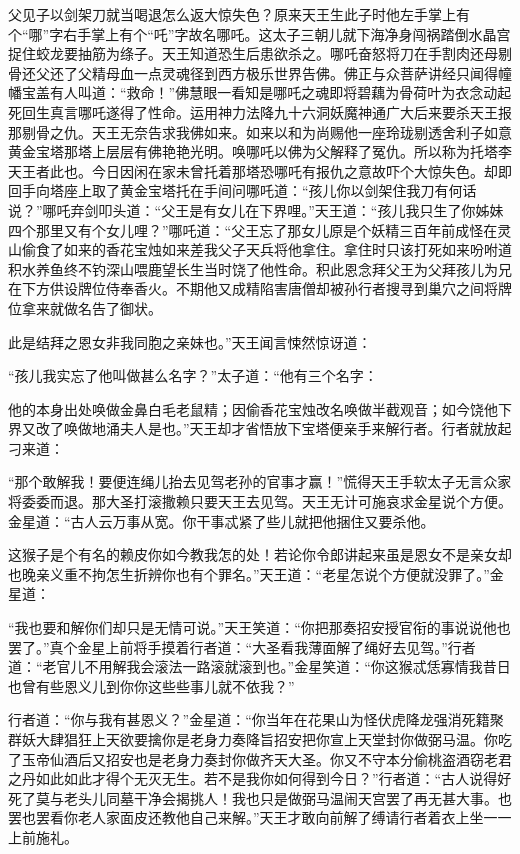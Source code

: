 \documentclass[12pt,UTF8]{ctexbook}
\begin{document}
{	父见子以剑架刀就当喝退怎么返大惊失色？原来天王生此子时他左手掌上有个“哪”字右手掌上有个“吒”字故名哪吒。这太子三朝儿就下海净身闯祸踏倒水晶宫捉住蛟龙要抽筋为绦子。天王知道恐生后患欲杀之。哪吒奋怒将刀在手割肉还母剔骨还父还了父精母血一点灵魂径到西方极乐世界告佛。佛正与众菩萨讲经只闻得幢幡宝盖有人叫道：“救命！”佛慧眼一看知是哪吒之魂即将碧藕为骨荷叶为衣念动起死回生真言哪吒遂得了性命。运用神力法降九十六洞妖魔神通广大后来要杀天王报那剔骨之仇。天王无奈告求我佛如来。如来以和为尚赐他一座玲珑剔透舍利子如意黄金宝塔那塔上层层有佛艳艳光明。唤哪吒以佛为父解释了冤仇。所以称为托塔李天王者此也。今日因闲在家未曾托着那塔恐哪吒有报仇之意故吓个大惊失色。却即回手向塔座上取了黄金宝塔托在手间问哪吒道：“孩儿你以剑架住我刀有何话说？”哪吒弃剑叩头道：“父王是有女儿在下界哩。”天王道：“孩儿我只生了你姊妹四个那里又有个女儿哩？”哪吒道：“父王忘了那女儿原是个妖精三百年前成怪在灵山偷食了如来的香花宝烛如来差我父子天兵将他拿住。拿住时只该打死如来吩咐道积水养鱼终不钓深山喂鹿望长生当时饶了他性命。积此恩念拜父王为父拜孩儿为兄在下方供设牌位侍奉香火。不期他又成精陷害唐僧却被孙行者搜寻到巢穴之间将牌位拿来就做名告了御状。
	
	此是结拜之恩女非我同胞之亲妹也。”天王闻言悚然惊讶道：
	
	“孩儿我实忘了他叫做甚么名字？”太子道：“他有三个名字：
	
	他的本身出处唤做金鼻白毛老鼠精；因偷香花宝烛改名唤做半截观音；如今饶他下界又改了唤做地涌夫人是也。”天王却才省悟放下宝塔便亲手来解行者。行者就放起刁来道：
	
	“那个敢解我！要便连绳儿抬去见驾老孙的官事才赢！”慌得天王手软太子无言众家将委委而退。那大圣打滚撒赖只要天王去见驾。天王无计可施哀求金星说个方便。金星道：“古人云万事从宽。你干事忒紧了些儿就把他捆住又要杀他。
	
	这猴子是个有名的赖皮你如今教我怎的处！若论你令郎讲起来虽是恩女不是亲女却也晚亲义重不拘怎生折辨你也有个罪名。”天王道：“老星怎说个方便就没罪了。”金星道：
	
	“我也要和解你们却只是无情可说。”天王笑道：“你把那奏招安授官衔的事说说他也罢了。”真个金星上前将手摸着行者道：“大圣看我薄面解了绳好去见驾。”行者道：“老官儿不用解我会滚法一路滚就滚到也。”金星笑道：“你这猴忒恁寡情我昔日也曾有些恩义儿到你你这些些事儿就不依我？”
	
	行者道：“你与我有甚恩义？”金星道：“你当年在花果山为怪伏虎降龙强消死籍聚群妖大肆猖狂上天欲要擒你是老身力奏降旨招安把你宣上天堂封你做弼马温。你吃了玉帝仙酒后又招安也是老身力奏封你做齐天大圣。你又不守本分偷桃盗酒窃老君之丹如此如此才得个无灭无生。若不是我你如何得到今日？”行者道：“古人说得好死了莫与老头儿同墓干净会揭挑人！我也只是做弼马温闹天宫罢了再无甚大事。也罢也罢看你老人家面皮还教他自己来解。”天王才敢向前解了缚请行者着衣上坐一一上前施礼。
	
}
\end{document}

